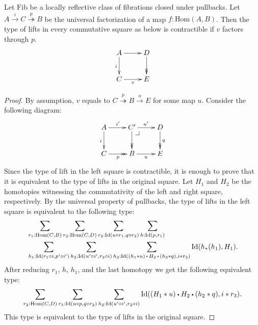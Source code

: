 \documentclass[reqno]{amsart}
\makeatletter
\theoremstyle{definition}
\theoremstyle{remark}
\newcommand{\fs}[1]{\mathrm{#1}}
\newcommand{\Hom}{\fs{Hom}}
\newcommand{\Id}{\fs{Id}}
\newcommand{\Fib}{\fs{Fib}}
\numberwithin{figure}{section}
\newcommand{\ct}{%
  \mathchoice{\mathbin{\raisebox{0.25ex}{$\displaystyle\centerdot$}}}%
             {\mathbin{\raisebox{0.25ex}{$\centerdot$}}}%
             {\mathbin{\raisebox{0.25ex}{$\scriptstyle\,\centerdot\,$}}}%
             {\mathbin{\raisebox{0.25ex}{$\scriptscriptstyle\,\centerdot\,$}}}
}
\newcommand{\pb}[1][dr]{\save*!/#1-1.2pc/#1:(-1,1)@^{|-}\restore}
\makeatother
\begin{document}
\begin{lem}
Let $\Fib$ be a locally reflective class of fibrations closed under pullbacks.
Let $A \xrightarrow{i} C \overset{p}\twoheadrightarrow B$ be the universal factorization of a map $f : \Hom(A,B)$.
Then the type of lifts in every commutative square as below is contractible if $v$ factors through $p$.
\[ \xymatrix{ A \ar[r] \ar[d]_i & D \ar@{->>}[d] \\
              C \ar[r]_v        & E
            } \]
\end{lem}
\begin{proof}
By assumption, $v$ equals to $C \overset{p}\twoheadrightarrow B \xrightarrow{u} E$ for some map $u$.
Consider the following diagram:
\[ \xymatrix{ A \ar[r]^{i'} \ar[d]_i    & C' \ar[r]^{u'} \ar@{->>}[d] \pb   & D \ar@{->>}[d]^q \\
              C \ar@{->>}[r]_p          & B \ar[r]_u                        & E
            } \]
Since the type of lift in the left square is contractible, it is enough to prove that it is equivalent to the type of lifts in the original square.
Let $H_1$ and $H_2$ be the homotopies witnessing the commutativity of the left and right square, respectively.
By the universal property of pullbacks, the type of lifts in the left square is equivalent to the following type:
\begin{align*}
& \sum_{r_1 : \Hom(C,B)} \sum_{r_2 : \Hom(C,D)} \sum_{r_3 : \Id(u \circ r_1, q \circ r_2)} \sum_{h : \Id(p,r_1)} \\
& \sum_{h_1 : \Id(r_1 \circ i, p' \circ i')} \sum_{h_2 : \Id(u' \circ i', r_2 \circ i)} \sum_{h_3 : \Id((h_1 * u) \ct H_2 \ct (h_2 * q), i * r_3)} \Id(h_*(h_1),H_1).
\end{align*}
After reducing $r_1$, $h$, $h_1$, and the last homotopy we get the following equivalent type:
\[ \sum_{r_2 : \Hom(C,D)} \sum_{r_3 : \Id(u \circ p, q \circ r_2)} \sum_{h_2 : \Id(u' \circ i', r_2 \circ i)} \Id((H_1 * u) \ct H_2 \ct (h_2 * q), i * r_3). \]
This type is equivalent to the type of lifts in the original square.
\end{proof}
\end{document}
